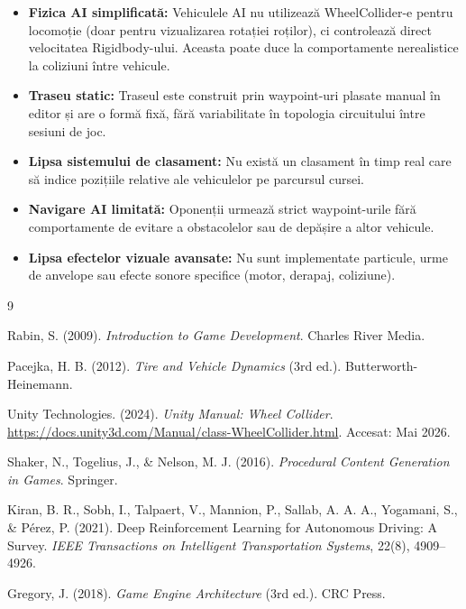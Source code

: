 \documentclass[11pt,twocolumn]{article}
\begin{document}
\begin{itemize}
    \item \textbf{Fizica AI simplificată:} Vehiculele AI nu utilizează WheelCollider-e pentru locomoție (doar pentru vizualizarea rotației roților), ci controlează direct velocitatea Rigidbody-ului. Aceasta poate duce la comportamente nerealistice la coliziuni între vehicule.

    \item \textbf{Traseu static:} Traseul este construit prin waypoint-uri plasate manual în editor și are o formă fixă, fără variabilitate în topologia circuitului între sesiuni de joc.

    \item \textbf{Lipsa sistemului de clasament:} Nu există un clasament în timp real care să indice pozițiile relative ale vehiculelor pe parcursul cursei.

    \item \textbf{Navigare AI limitată:} Oponenții urmează strict waypoint-urile fără comportamente de evitare a obstacolelor sau de depășire a altor vehicule.

    \item \textbf{Lipsa efectelor vizuale avansate:} Nu sunt implementate particule, urme de anvelope sau efecte sonore specifice (motor, derapaj, coliziune).
\end{itemize}

\begin{thebibliography}{9}

Rabin, S. (2009).
\textit{Introduction to Game Development}.
Charles River Media.

Pacejka, H. B. (2012).
\textit{Tire and Vehicle Dynamics} (3rd ed.).
Butterworth-Heinemann.

Unity Technologies. (2024).
\textit{Unity Manual: Wheel Collider}.
\url{https://docs.unity3d.com/Manual/class-WheelCollider.html}.
Accesat: Mai 2026.

Shaker, N., Togelius, J., \& Nelson, M. J. (2016).
\textit{Procedural Content Generation in Games}.
Springer.

Kiran, B. R., Sobh, I., Talpaert, V., Mannion, P., Sallab, A. A. A., Yogamani, S., \& Pérez, P. (2021).
Deep Reinforcement Learning for Autonomous Driving: A Survey.
\textit{IEEE Transactions on Intelligent Transportation Systems}, 22(8), 4909--4926.

Gregory, J. (2018).
\textit{Game Engine Architecture} (3rd ed.).
CRC Press.

\end{thebibliography}
\end{document}

